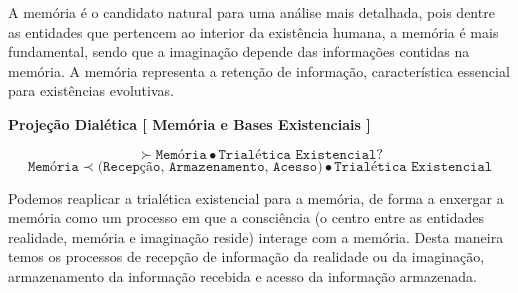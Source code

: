 \documentclass[10pt,a4paper]{report}
\begin{document}








A memória é o candidato natural para uma análise mais detalhada, pois dentre as entidades que pertencem ao interior da existência humana, a memória é mais fundamental, sendo que a imaginação depende das informações contidas na memória. A memória representa a retenção de informação, característica essencial para existências evolutivas.

\hspace{\baselineskip}

\textbf{Projeção Dialética [ Memória e Bases Existenciais ]} 

$$ \succ \texttt{Memória} \bullet \texttt{Trialética Existencial} ? $$
$$ \texttt{Memória} \prec \texttt{(Recepção, Armazenamento, Acesso)} \bullet \texttt{Trialética Existencial} $$
\hrulefill

Podemos reaplicar a trialética existencial para a memória, de forma a enxergar a memória como um processo em que a consciência (o centro entre as entidades realidade, memória e imaginação reside) interage com a memória. Desta maneira temos os processos de recepção de informação da realidade ou da imaginação, armazenamento da informação recebida e acesso da informação armazenada.\\
\end{document}
